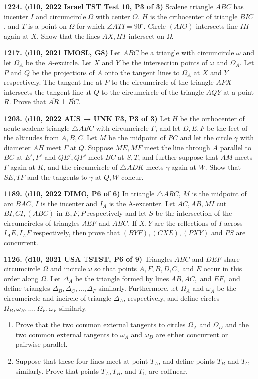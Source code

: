 \documentclass{article}
\begin{document}
\textbf{1224. (\color{red}d10\color{black}, 2022 Israel TST Test 10, P3 of 3)} Scalene triangle $ABC$ has incenter $I$ and circumcircle $\Omega$ with center $O$. $H$ is the orthocenter of triangle $BIC$, and $T$ is a point on $\Omega$ for which $\angle ATI=90^\circ$. Circle $(AIO)$ intersects line $IH$ again at $X$. Show that the lines $AX, HT$ intersect on $\Omega$.


\textbf{1217. (\color{red}d10\color{black}, 2021 IMOSL, G8)} Let $ABC$ be a triangle with circumcircle $\omega$ and let $\Omega_A$ be the $A$-excircle. Let $X$ and $Y$ be the intersection points of $\omega$ and $\Omega_A$. Let $P$ and $Q$ be the projections of $A$ onto the tangent lines to $\Omega_A$ at $X$ and $Y$ respectively. The tangent line at $P$ to the circumcircle of the triangle $APX$ intersects the tangent line at $Q$ to the circumcircle of the triangle $AQY$ at a point $R$. Prove that $\overline{AR} \perp \overline{BC}$.

\textbf{1203. (\color{red}d10\color{black}, 2022 AUS → UNK F3, P3 of 3)} Let $H$ be the orthocenter of acute scalene triangle $\triangle ABC$ with circumcircle $\Gamma$, and let $D, E, F$ be the feet of the altitudes from $A, B, C$. Let $M$ be the midpoint of $BC$ and let the circle $\gamma$ with diameter $AH$ meet $\Gamma$ at $Q$. Suppose $ME, MF$ meet the line through $A$ parallel to $BC$ at $E', F'$ and $QE', QF'$ meet $BC$ at $S, T$, and further suppose that $AM$ meets $\Gamma$ again at $K$, and the circumcircle of $\triangle ADK$ meets $\gamma$ again at $W$. Show that $SE, TF$ and the tangents to $\gamma$ at $Q, W$ concur.

\textbf{1189. (\color{red}d10\color{black}, 2022 DIMO, P6 of 6)} In triangle $\triangle ABC$, $M$ is the midpoint of arc $BAC$, $I$ is the incenter and $I_A$ is the A-excenter. Let $AC,AB,MI$ cut $BI,CI,(ABC)$ in $E,F,P$ respectively and let $S$ be the intersection of the circumcircles of triangles $AEF$ and $ABC$. If $X,Y$ are the reflections of $I$ across $I_AE,I_AF$ respectively, then prove that $(BYF), (CXE), (PXY)$ and $PS$ are concurrent.

\textbf{1126. (\color{red}d10\color{black}, 2021 USA TSTST, P6 of 9)} Triangles $ABC$ and $DEF$ share circumcircle $\Omega$ and incircle $\omega$ so that points $A,F,B,D,C,$ and $E$ occur in this order along $\Omega$. Let $\Delta_A$ be the triangle formed by lines $AB, AC,$ and $EF,$ and define triangles $\Delta_B, \Delta_C, \ldots, \Delta_F$ similarly. Furthermore, let $\Omega_A$ and $\omega_A$ be the circumcircle and incircle of triangle $\Delta_A$, respectively, and define circles $\Omega_B, \omega_B, \ldots, \Omega_F, \omega_F$ similarly.
\begin{enumerate}
    \item Prove that the two common external tangents to circles $\Omega_A$ and $\Omega_D$ and the two common external tangents to $\omega_A$ and $\omega_D$ are either concurrent or pairwise parallel.
    \item Suppose that these four lines meet at point $T_A$, and define points $T_B$ and $T_C$ similarly. Prove that points $T_A, T_B$, and $T_C$ are collinear.
\end{enumerate}
\end{document}
